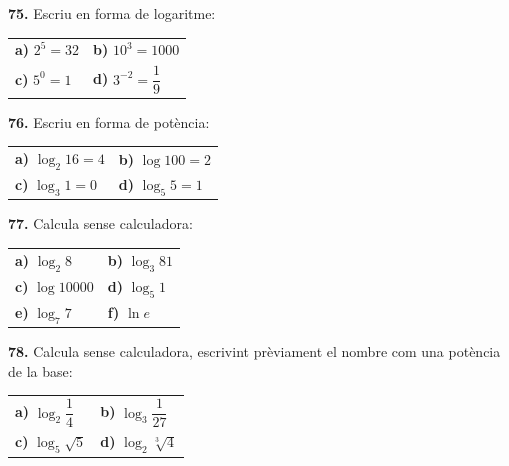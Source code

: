 \documentclass[13pt,a4paper]{extarticle}
\begin{document}
\par\noindent\begin{minipage}{\linewidth}
\textbf{75.} Escriu en forma de logaritme:\par

\begin{tabular}{@{}p{.46\linewidth}p{.46\linewidth}@{}}
\textbf{a)} $2^5=32$ & \textbf{b)} $10^3=1000$ \\[2pt]
\textbf{c)} $5^0=1$ & \textbf{d)} $3^{-2}=\dfrac{1}{9}$ \\[2pt]
\end{tabular}\par
\end{minipage}\par\vspace{1.6mm}
\par\noindent\begin{minipage}{\linewidth}
\textbf{76.} Escriu en forma de potència:\par

\begin{tabular}{@{}p{.46\linewidth}p{.46\linewidth}@{}}
\textbf{a)} $\log_2 16=4$ & \textbf{b)} $\log 100=2$ \\[2pt]
\textbf{c)} $\log_3 1=0$ & \textbf{d)} $\log_5 5=1$ \\[2pt]
\end{tabular}\par
\end{minipage}\par\vspace{1.6mm}
\par\noindent\begin{minipage}{\linewidth}
\textbf{77.} Calcula sense calculadora:\par

\begin{tabular}{@{}p{.46\linewidth}p{.46\linewidth}@{}}
\textbf{a)} $\log_2 8$ & \textbf{b)} $\log_3 81$ \\[2pt]
\textbf{c)} $\log 10000$ & \textbf{d)} $\log_5 1$ \\[2pt]
\textbf{e)} $\log_7 7$ & \textbf{f)} $\ln e$ \\[2pt]
\end{tabular}\par
\end{minipage}\par\vspace{1.6mm}
\par\noindent\begin{minipage}{\linewidth}
\textbf{78.} Calcula sense calculadora, escrivint prèviament el nombre com una potència de la base:\par

\begin{tabular}{@{}p{.46\linewidth}p{.46\linewidth}@{}}
\textbf{a)} $\log_2 \dfrac{1}{4}$ & \textbf{b)} $\log_3 \dfrac{1}{27}$ \\[2pt]
\textbf{c)} $\log_5 \sqrt5$ & \textbf{d)} $\log_2 \sqrt[3]{4}$ \\[2pt]
\end{tabular}\par
\end{minipage}\par\vspace{1.6mm}
\end{document}
